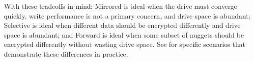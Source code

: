 With these tradeoffs in mind: Mirrored is ideal when the drive must converge
quickly, write performance is not a primary concern, and drive space is
abundant; Selective is ideal when different data should be encrypted differently
and drive space is abundant; and Forward is ideal when some subset of nuggets
should be encrypted differently without wasting drive space. See
 for specific scenarios that demonstrate these differences in
practice.

\fi
